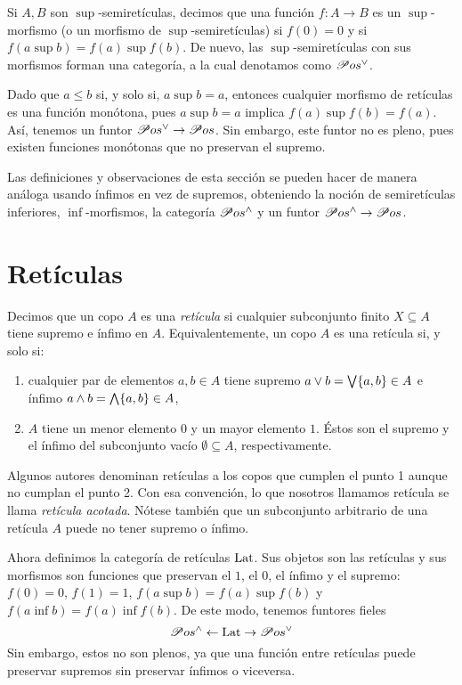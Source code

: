 Si $A,B$ son $\sup$-semiretículas,
decimos que una función $f:A\to B$ es
un $\sup$-morfismo (o un morfismo de $\sup$-semiretículas)
si $f(0)=0$ y si $f(a\sup b)=f(a)\sup f(b)$.
De nuevo, las $\sup$-semiretículas con sus morfismos forman una
categoría, a la cual denotamos como $\mathscr{P}os^\vee$.

Dado que $a\leq b$ si, y solo si, $a\sup b=a$, entonces
cualquier morfismo de retículas es una función monótona,
pues $a\sup b=a$ implica $f(a)\sup f(b)=f(a)$.
Así, tenemos un funtor $\mathscr{P}os^\vee\to\mathscr{P}os$. Sin embargo, este
funtor no es pleno, pues existen funciones monótonas que no
preservan el supremo.

Las definiciones y observaciones de esta sección se pueden hacer
de manera análoga usando ínfimos en vez de supremos, obteniendo
la noción de semiretículas inferiores, $\inf$-morfismos, la
categoría $\mathscr{P}os^{\wedge}$ y un funtor $\mathscr{P}os^{\wedge}\to\mathscr{P}os$.

\section{Retículas}\label{ret}

Decimos que un copo $A$ es una \emph{ retícula } si cualquier
subconjunto finito $X\subseteq A$ tiene supremo e ínfimo en $A$.
Equivalentemente, un copo $A$ es una retícula si, y solo si:
\begin{enumerate}
    \item cualquier par de elementos $a,b\in A$ tiene
    supremo $a\vee b=\bigvee\{a,b\}\in A$ e ínfimo $a\wedge
    b=\bigwedge\{a,b\}\in A$,
    \item
    $A$ tiene un menor elemento $0$ y un mayor elemento $1$.
    Éstos son el supremo y el ínfimo del subconjunto vacío
    $\emptyset\subseteq A$, respectivamente.
\end{enumerate}
Algunos autores denominan retículas a los copos que
cumplen el punto 1 aunque no cumplan el punto 2.
Con esa convención, lo que nosotros llamamos retícula se llama
\emph{ retícula acotada}.
Nótese también que un subconjunto arbitrario de una retícula $A$
puede no tener supremo o ínfimo.

Ahora definimos la categoría de retículas $\mathrm{Lat}$.
Sus objetos son las retículas y sus
morfismos son funciones que preservan el $1$, el $0$,
el ínfimo y el supremo: $f(0)=0$, $f(1)=1$,
$f(a\sup b)=f(a)\sup f(b)$ y $f(a\inf b)=f(a)\inf f(b)$.
De este modo, tenemos funtores fieles
\begin{equation}
  \mathscr{P}os^{\wedge}\leftarrow\mathrm{Lat}\to\mathscr{P}os^{\vee}
\end{equation}
Sin embargo, estos no son plenos, ya que una función entre retículas
puede preservar supremos sin preservar ínfimos o viceversa.

